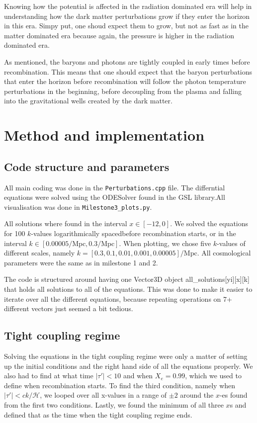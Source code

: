 \documentclass[12pt]{article}
\begin{document}
Knowing how the potential is affected in the radiation dominated era will help in understanding how the dark matter perturbations grow if they enter the horizon in this era. Simpy put, one shoud expect them to grow, but not as fast as in the matter dominated era because again, the pressure is higher in the radiation dominated era. 

As mentioned, the baryons and photons are tightly coupled in early times before recombination. This means that one should expect that the baryon perturbations that enter the horizon before recombination will follow the photon temperature perturbations in the beginning, before decoupling from the plasma and falling into the gravitational wells created by the dark matter. 




\section{Method and implementation}
\subsection{Code structure and parameters}
All main coding was done in the \texttt{Perturbations.cpp} file. The differntial equations were solved using the ODESolver found in the GSL library.All visualisation was done in \texttt{Milestone3\_plots.py}. 

All solutions where found in the interval $x\in[-12,0]$. We solved the equations for 100 $k$-values logarithmically spacedbefore recombination starts, or  in the interval $k\in[0.00005/\mathrm{Mpc}, 0.3/\mathrm{Mpc}]$. When plotting, we chose five $k$-values of different scales, namely $k=[0.3, 0.1,0.01,0.001,0.00005]/\mathrm{Mpc}$. All cosmological parameters were the same as in milestone 1 and 2. 

The code is structured around having one Vector3D object all\_solutions[yi][x][k] that holds all solutions to all of the equations. This was done to make it easier to iterate over all the different equations, because repeating operations on 7+ different vectors just seemed a bit tedious.

\subsection{Tight coupling regime}
Solving the equations in the tight coupling regime were only a matter of setting up the initial conditions and the right hand side of all the equations properly. We also had to find at what time  $|\tau'|<10$ and when $X_e=0.99$, which we used to define when recombination starts. To find the third condition, namely when $|\tau'|<ck/\mathcal{H}$, we looped over all x-values in a range of $\pm 2$ around the $x$-es found from the first two conditions. Lastly, we found the minimum of all three $x$s and defined that as the time when the tight coupling regime ends. 
\end{document}
